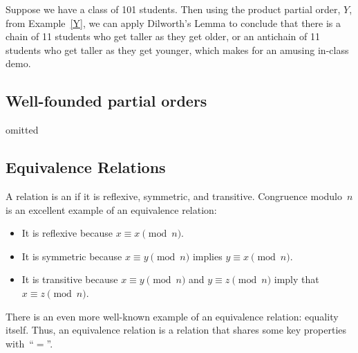 \begin{example}
Suppose we have a class of 101 students.  Then using the product partial
order, $Y$, from Example~\ref{Y}, we can apply Dilworth's Lemma to
conclude that there is a chain of 11 students who get taller as they get
older, or an antichain of 11 students who get taller as they get younger,
which makes for an amusing in-class demo.
\end{example}

\begin{problems}
\practiceproblems
{}
{}

\classproblems
{}

\homeworkproblems
{}
\end{problems}

\begin{staffnotes}
\chapter*{Well-founded partial orders}
omitted
\end{staffnotes}

\section{Equivalence Relations}\label{equiv_rel_sec}
A relation is an  if it is reflexive,
symmetric, and transitive.  Congruence modulo~$n$ is an excellent
example of an equivalence relation:
\begin{itemize}

\item
It is reflexive because $x \equiv x \pmod{n}$.

\item
It is symmetric because $x \equiv y \pmod{n}$ implies $y \equiv x
\pmod{n}$.

\item
It is transitive because $x \equiv y \pmod{n}$ and $y \equiv z
\pmod{n}$ imply that $x \equiv z \pmod{n}$.

\end{itemize}
There is an even more well-known example of an equivalence relation:
equality itself.  Thus, an equivalence relation is a relation that
shares some key properties with~``$=$''.

